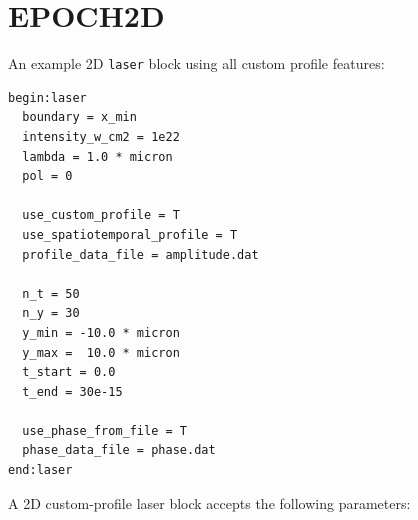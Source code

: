 \documentclass[11pt,a4paper]{article}
\begin{document}
\section{EPOCH2D}

An example 2D \texttt{laser} block using all custom profile features:

\begin{lstlisting}[style=deck]
begin:laser
  boundary = x_min
  intensity_w_cm2 = 1e22
  lambda = 1.0 * micron
  pol = 0

  use_custom_profile = T
  use_spatiotemporal_profile = T
  profile_data_file = amplitude.dat

  n_t = 50
  n_y = 30
  y_min = -10.0 * micron
  y_max =  10.0 * micron
  t_start = 0.0
  t_end = 30e-15

  use_phase_from_file = T
  phase_data_file = phase.dat
end:laser
\end{lstlisting}

A 2D custom-profile laser block accepts the following parameters:
\end{document}
